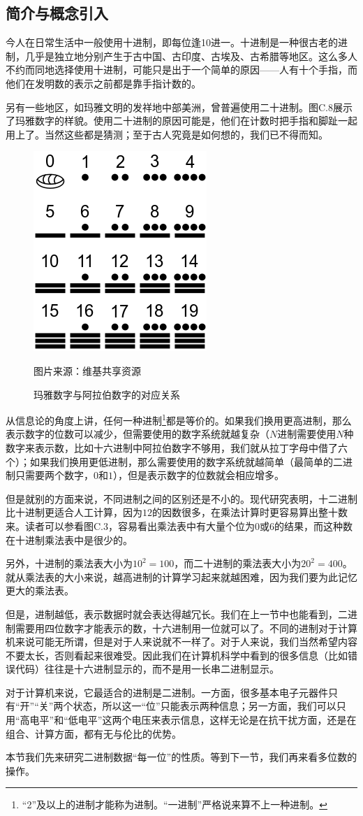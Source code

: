 \subsection*{简介与概念引入}
今人在日常生活中一般使用十进制，即每位逢10进一。十进制是一种很古老的进制，几乎是独立地分别产生于古中国、古印度、古埃及、古希腊等地区。这么多人不约而同地选择使用十进制，可能只是出于一个简单的原因——人有十个手指，而他们在发明数的表示之前都是靠手指计数的。\par
另有一些地区，如玛雅文明的发祥地中部美洲，曾普遍使用二十进制。图C.8展示了玛雅数字的样貌。使用二十进制的原因可能是，他们在计数时把手指和脚趾一起用上了。当然这些都是猜测；至于古人究竟是如何想的，我们已不得而知。\par
\begin{figure}[htbp]
    \centering
    \includegraphics[width=.3\textwidth]{../images/other_parts/C_maya_numbers.png}
    \caption{玛雅数字与阿拉伯数字的对应关系}
    \footnotesize{图片来源：维基共享资源}
\end{figure}
从信息论的角度上讲，任何一种进制\footnote{``2''及以上的进制才能称为进制。``一进制''严格说来算不上一种进制。}都是等价的。如果我们换用更高进制，那么表示数字的位数可以减少，但需要使用的数字系统就越复杂（$N$进制需要使用$N$种数字来表示数，比如十六进制中阿拉伯数字不够用，我们就从拉丁字母中借了六个）；如果我们换用更低进制，那么需要使用的数字系统就越简单（最简单的二进制只需要两个数字，$0$和$1$），但是表示数字的位数就会相应增多。\par
但是就别的方面来说，不同进制之间的区别还是不小的。现代研究表明，十二进制比十进制更适合人工计算，因为$12$的因数很多，在乘法计算时更容易算出整十数来。读者可以参看图C.3，容易看出乘法表中有大量个位为$0$或$6$的结果，而这种数在十进制乘法表中是很少的。\par
另外，十进制的乘法表大小为$10^2=100$，而二十进制的乘法表大小为$20^2=400$。就从乘法表的大小来说，越高进制的计算学习起来就越困难，因为我们要为此记忆更大的乘法表。\par
但是，进制越低，表示数据时就会表达得越冗长。我们在上一节中也能看到，二进制需要用四位数字才能表示的数，十六进制用一位就可以了。不同的进制对于计算机来说可能无所谓，但是对于人来说就不一样了。对于人来说，我们当然希望内容不要太长，否则看起来很难受。因此我们在计算机科学中看到的很多信息（比如错误代码）往往是十六进制显示的，而不是用一长串二进制显示。\par
对于计算机来说，它最适合的进制是二进制。一方面，很多基本电子元器件只有``开''``关''两个状态，所以这一``位''只能表示两种信息；另一方面，我们可以只用``高电平''和``低电平''这两个电压来表示信息，这样无论是在抗干扰方面，还是在组合、计算方面，都有无与伦比的优势。\par
本节我们先来研究二进制数据``每一位''的性质。等到下一节，我们再来看多位数的操作。
